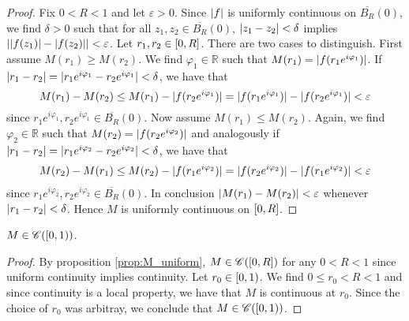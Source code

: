 \begin{enumerate}[label = \textbf{Exercise \arabic*.},wide = 0pt, itemsep=1.5ex]
\begin{enumerate}[label = (\roman*),wide = 0pt, itemsep=1.5ex]
				\begin{proof}
					Fix $0 < R < 1$ and let $\varepsilon > 0$. Since $\abs[0]{f}$ is uniformly continuous on $\overline{B_R}(0)$, we find $\delta > 0$ such that for all $z_1,z_2 \in \overline{B_R}(0)$, $\abs[0]{z_1 - z_2} < \delta$ implies $\abs[0]{\abs[0]{f(z_1)} - \abs[0]{f(z_2)}} < \varepsilon$. Let $r_1,r_2 \in \intcc{0,R}$. There are two cases to distinguish. First assume $M(r_1) \geq M(r_2)$. We find $\varphi_1 \in \mathbb{R}$ such that $M(r_1) = \abs[0]{f(r_1e^{i\varphi_1})}$. If $\abs[0]{r_1 - r_2} = \abs[0]{r_1e^{i\varphi_1} - r_2e^{i\varphi_1}} < \delta$, we have that
				\begin{equation}
					M(r_1) - M(r_2) \leq M(r_1) - \abs[0]{f(r_2e^{i\varphi_1})} = \abs[0]{f(r_1e^{i\varphi_1})} - \abs[0]{f(r_2e^{i\varphi_1})} < \varepsilon
				\end{equation}
				\noindent since $r_1e^{i\varphi_1},r_2e^{i\varphi_1} \in \overline{B_R}(0)$. Now assume $M(r_1) \leq M(r_2)$. Again, we find $\varphi_2 \in \mathbb{R}$ such that $M(r_2) = \abs[0]{f(r_2 e^{i\varphi_2})}$ and analogously if $\abs[0]{r_1 - r_2} = \abs[0]{r_1e^{i\varphi_2} - r_2e^{i\varphi_2}} < \delta$, we have that
				\begin{align*}
					M(r_2) - M(r_1) \leq M(r_2) - \abs[0]{f(r_1e^{i\varphi_2})} = \abs[0]{f(r_2e^{i\varphi_2})} - \abs[0]{f(r_1e^{i\varphi_2})} < \varepsilon
				\end{align*}
				\noindent since $r_1e^{i\varphi_2},r_2e^{i\varphi_2} \in \overline{B_R}(0)$. In conclusion $\abs[0]{M(r_1) - M(r_2)} < \varepsilon$ whenever $\abs[0]{r_1 - r_2} < \delta$. Hence $M$ is uniformly continuous on $\intcc{0,R}$.
				\end{proof}

				\begin{corollary}
					$M \in \mathscr{C}(\intco{0,1})$.
				\end{corollary}
				\begin{proof}
					By proposition \ref{prop:M_uniform}, $M \in \mathscr{C}(\intcc{0,R})$ for any $0 < R < 1$ since uniform continuity implies continuity. Let $r_0 \in \intco{0,1}$. We find $0 \leq r_0 < R < 1$ and since continuity is a local property, we have that $M$ is continuous at $r_0$. Since the choice of $r_0$ was arbitray, we conclude that $M \in \mathscr{C}(\intco{0,1})$.
				\end{proof}
 

\end{enumerate}
\end{enumerate}
